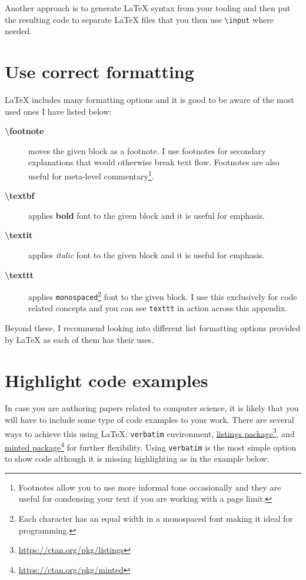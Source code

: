 Another approach is to generate LaTeX syntax from your tooling and then put the resulting code to separate LaTeX files that you then use \texttt{\textbackslash input} where needed.

\section{Use correct formatting}

LaTeX includes many formatting options and it is good to be aware of the most used ones I have listed below:

\begin{description}
    \item[\textbf{\textbackslash footnote}] moves the given block as a footnote. I use footnotes for secondary explanations that would otherwise break text flow. Footnotes are also useful for meta-level commentary\footnote{Footnotes allow you to use more informal tone occasionally and they are useful for condensing your text if you are working with a page limit.}.
    \item[\textbf{\textbackslash textbf}] applies \textbf{bold} font to the given block and it is useful for emphasis.
    \item[\textbf{\textbackslash textit}] applies \textit{italic} font to the given block and it is useful for emphasis.
    \item[\textbf{\textbackslash texttt}] applies \texttt{monospaced}\footnote{Each character has an equal width in a monospaced font making it ideal for programming.} font to the given block. I use this exclusively for code related concepts and you can see \texttt{texttt} in action across this appendix.
\end{description}

Beyond these, I recommend looking into different list formatting options provided by LaTeX as each of them has their uses.

\section{Highlight code examples}

In case you are authoring papers related to computer science, it is likely that you will have to include some type of code examples to your work.
There are several ways to achieve this using LaTeX: \texttt{verbatim} environment, \href{https://ctan.org/pkg/listings}{listings package}\footnote{\url{https://ctan.org/pkg/listings}}, and \href{https://ctan.org/pkg/minted}{minted package}\footnote{\url{https://ctan.org/pkg/minted}} for further flexibility.
Using \texttt{verbatim} is the most simple option to show code although it is missing highlighting as in the example below:

